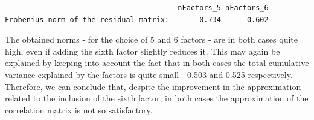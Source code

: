 \documentclass[
  letterpaper,
  DIV=11,
  numbers=noendperiod]{scrartcl}
\newenvironment{Shaded}{\begin{snugshade}}{\end{snugshade}}
\newcommand{\DecValTok}[1]{\textcolor[rgb]{0.68,0.00,0.00}{#1}}
\newcommand{\FloatTok}[1]{\textcolor[rgb]{0.68,0.00,0.00}{#1}}
\newcommand{\FunctionTok}[1]{\textcolor[rgb]{0.28,0.35,0.67}{#1}}
\newcommand{\NormalTok}[1]{\textcolor[rgb]{0.00,0.23,0.31}{#1}}
\newcommand{\OtherTok}[1]{\textcolor[rgb]{0.00,0.23,0.31}{#1}}
\newcommand{\SpecialCharTok}[1]{\textcolor[rgb]{0.37,0.37,0.37}{#1}}
\newcommand{\StringTok}[1]{\textcolor[rgb]{0.13,0.47,0.30}{#1}}
\begin{document}
\begin{Shaded}
\end{Shaded}

\begin{verbatim}
                                        nFactors_5 nFactors_6
Frobenius norm of the residual matrix:       0.734      0.602
\end{verbatim}

The obtained norms - for the choice of 5 and 6 factors - are in both
cases quite high, even if adding the sixth factor slightly reduces it.
This may again be explained by keeping into account the fact that in
both cases the total cumulative variance explained by the factors is
quite small - 0.503 and 0.525 respectively. Therefore, we can conclude
that, despite the improvement in the approximation related to the
inclusion of the sixth factor, in both cases the approximation of the
correlation matrix is not so satisfactory.
\end{document}
